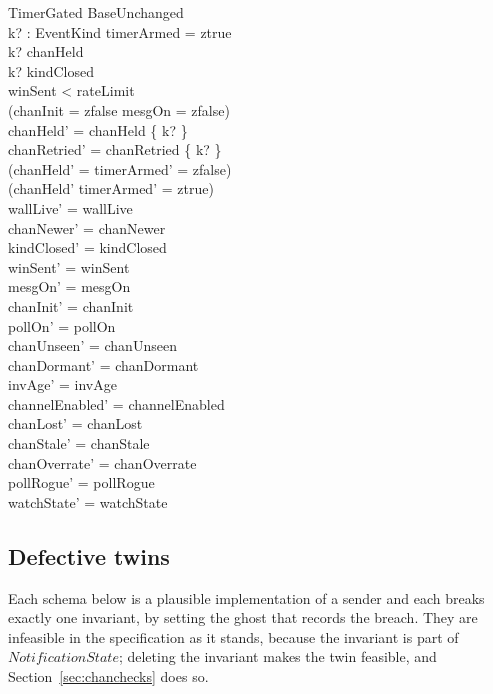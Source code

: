 \documentclass[a4paper,10pt,fleqn]{article}
\begin{document}
\begin{schema}{TimerGated}
  BaseUnchanged \\
  k? : EventKind
  \where
  timerArmed = ztrue \\
  k? \in chanHeld \\
  k? \notin kindClosed \\
  winSent < rateLimit \\
  (chanInit = zfalse \lor mesgOn = zfalse) \\
  chanHeld' = chanHeld \setminus \{ k? \} \\
  chanRetried' = chanRetried \setminus \{ k? \} \\
  (chanHeld' = \emptyset \implies timerArmed' = zfalse) \\
  (chanHeld' \neq \emptyset \implies timerArmed' = ztrue) \\
  wallLive' = wallLive \\
  chanNewer' = chanNewer \\
  kindClosed' = kindClosed \\
  winSent' = winSent \\
  mesgOn' = mesgOn \\
  chanInit' = chanInit \\
  pollOn' = pollOn \\
  chanUnseen' = chanUnseen \\
  chanDormant' = chanDormant \\
  invAge' = invAge \\
  channelEnabled' = channelEnabled \\
  chanLost' = chanLost \\
  chanStale' = chanStale \\
  chanOverrate' = chanOverrate \\
  pollRogue' = pollRogue \\
  watchState' = watchState
\end{schema}

\subsection{Defective twins}
\label{sec:chantwins}

Each schema below is a plausible implementation of a sender and each breaks
exactly one invariant, by setting the ghost that records the breach.  They
are infeasible in the specification as it stands, because the invariant is
part of $NotificationState$; deleting the invariant makes the twin
feasible, and Section~\ref{sec:chanchecks} does so.
\end{document}
